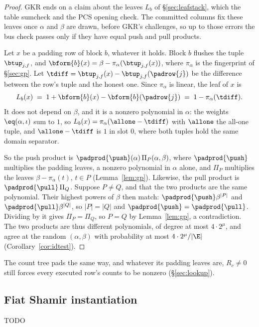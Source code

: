 \begin{proof}
GKR ends on a claim about the leaves $L_b$ of \S\ref{sec:leafstack}, which the table sumcheck and the PCS opening check. The committed columns fix these leaves once $\alpha$ and $\beta$ are drawn, before GKR's challenges, so up to those errors the bus check passes only if they have equal push and pull products.

Let $x$ be a padding row of block $b$, whatever it holds. Block $b$ flushes the tuple $\btup_{j,f}$, and $\bform{b}(x)=\beta-\pi_\alpha(\btup_{j,f}(x))$, where $\pi_\alpha$ is the fingerprint of \S\ref{sec:gp}. Let $\tdiff=\btup_{j,f}(x)-\btup_{j,f}(\padrow{j})$ be the difference between the row's tuple and the honest one. Since $\pi_\alpha$ is linear, the leaf of $x$ is
\[
  L_b(x)\;=\;1+\bform{b}(x)-\bform{b}(\padrow{j})\;=\;1-\pi_\alpha(\tdiff).
\]
It does not depend on $\beta$, and it is a nonzero polynomial in $\alpha$: the weights $\eq(\alpha,\iota)$ sum to $1$, so $L_b(x)=\pi_\alpha(\allone-\tdiff)$ with $\allone$ the all-one tuple, and $\allone-\tdiff$ is $1$ in slot $0$, where both tuples hold the same domain separator.

So the push product is $\padprod{\push}(\alpha)\,\Pi_P(\alpha,\beta)$, where $\padprod{\push}$ multiplies the padding leaves, a nonzero polynomial in $\alpha$ alone, and $\Pi_P$ multiplies the leaves $\beta-\pi_\alpha(t)$, $t\in P$ (Lemma~\ref{lem:gp}). Likewise, the pull product is $\padprod{\pull}\,\Pi_Q$. Suppose $P\neq Q$, and that the two products are the same polynomial. Their highest powers of $\beta$ then match: $\padprod{\push}\beta^{|P|}$ and $\padprod{\pull}\beta^{|Q|}$, so $|P|=|Q|$ and $\padprod{\push}=\padprod{\pull}$. Dividing by it gives $\Pi_P=\Pi_Q$, so $P=Q$ by Lemma~\ref{lem:gp}, a contradiction. The two products are thus different polynomials, of degree at most $4\cdot2^{\mu}$, and agree at the random $(\alpha,\beta)$ with probability at most $4\cdot2^{\mu}/|\E|$ (Corollary~\ref{cor:idtest}).
\end{proof}

The count tree pads the same way, and whatever its padding leaves are, $R_c\neq0$ still forces every executed row's counts to be nonzero (\S\ref{sec:lookup}).

\subsection{Fiat Shamir instantiation}\label{sec:e2e-fiat-shamir}

TODO

